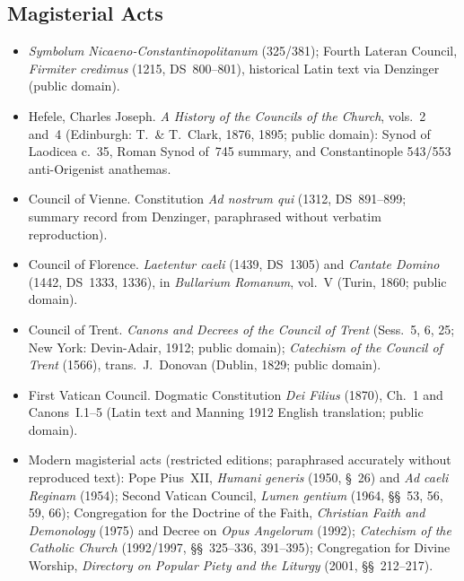 \subsection{Magisterial Acts}
\begin{itemize}
\item \emph{Symbolum Nicaeno-Constantinopolitanum} (325/381); Fourth Lateran Council, \emph{Firmiter credimus} (1215, DS~800--801), historical Latin text via Denzinger (public domain).
\item Hefele, Charles Joseph. \emph{A History of the Councils of the Church}, vols.~2 and~4 (Edinburgh: T.\ \& T.~Clark, 1876, 1895; public domain): Synod of Laodicea c.~35, Roman Synod of~745 summary, and Constantinople 543/553 anti-Origenist anathemas.
\item Council of Vienne. Constitution \emph{Ad nostrum qui} (1312, DS~891--899; summary record from Denzinger, paraphrased without verbatim reproduction).
\item Council of Florence. \emph{Laetentur caeli} (1439, DS~1305) and \emph{Cantate Domino} (1442, DS~1333, 1336), in \emph{Bullarium Romanum}, vol.~V (Turin, 1860; public domain).
\item Council of Trent. \emph{Canons and Decrees of the Council of Trent} (Sess.~5, 6, 25; New York: Devin-Adair, 1912; public domain); \emph{Catechism of the Council of Trent} (1566), trans.\ J.~Donovan (Dublin, 1829; public domain).
\item First Vatican Council. Dogmatic Constitution \emph{Dei Filius} (1870), Ch.~1 and Canons~I.1--5 (Latin text and Manning 1912 English translation; public domain).
\item Modern magisterial acts (restricted editions; paraphrased accurately without reproduced text): Pope Pius~XII, \emph{Humani generis} (1950, \S~26) and \emph{Ad caeli Reginam} (1954); Second Vatican Council, \emph{Lumen gentium} (1964, \S\S~53, 56, 59, 66); Congregation for the Doctrine of the Faith, \emph{Christian Faith and Demonology} (1975) and Decree on \emph{Opus Angelorum} (1992); \emph{Catechism of the Catholic Church} (1992/1997, \S\S~325--336, 391--395); Congregation for Divine Worship, \emph{Directory on Popular Piety and the Liturgy} (2001, \S\S~212--217).
\end{itemize}

